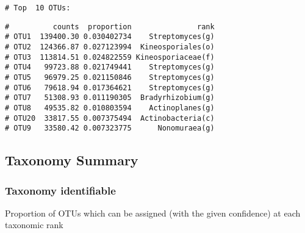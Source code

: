 \documentclass[
]{article}
\newenvironment{Shaded}{\begin{snugshade}}{\end{snugshade}}
\newcommand{\AttributeTok}[1]{\textcolor[rgb]{0.77,0.63,0.00}{#1}}
\newcommand{\DecValTok}[1]{\textcolor[rgb]{0.00,0.00,0.81}{#1}}
\newcommand{\FunctionTok}[1]{\textcolor[rgb]{0.00,0.00,0.00}{#1}}
\newcommand{\NormalTok}[1]{#1}
\newcommand{\SpecialCharTok}[1]{\textcolor[rgb]{0.00,0.00,0.00}{#1}}
\begin{document}
\begin{verbatim}
# Top  10 OTUs:
\end{verbatim}

\begin{Shaded}
\end{Shaded}

\begin{verbatim}
#          counts  proportion               rank
# OTU1  139400.30 0.030402734    Streptomyces(g)
# OTU2  124366.87 0.027123994  Kineosporiales(o)
# OTU3  113814.51 0.024822559 Kineosporiaceae(f)
# OTU4   99723.88 0.021749441    Streptomyces(g)
# OTU5   96979.25 0.021150846    Streptomyces(g)
# OTU6   79618.94 0.017364621    Streptomyces(g)
# OTU7   51308.93 0.011190305  Bradyrhizobium(g)
# OTU8   49535.82 0.010803594    Actinoplanes(g)
# OTU20  33817.55 0.007375494  Actinobacteria(c)
# OTU9   33580.42 0.007323775      Nonomuraea(g)
\end{verbatim}

\hypertarget{taxonomy-summary-1}{%
\subsection{Taxonomy Summary}\label{taxonomy-summary-1}}

\hypertarget{taxonomy-identifiable-1}{%
\subsubsection{Taxonomy identifiable}\label{taxonomy-identifiable-1}}

Proportion of OTUs which can be assigned (with the given confidence) at
each taxonomic rank
\end{document}
